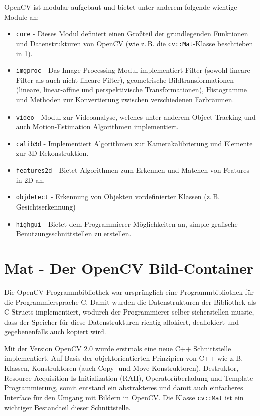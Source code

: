 \documentclass{whswinvcbook}
\begin{document}
OpenCV ist modular aufgebaut und bietet unter anderem folgende wichtige Module an:
\begin{itemize}
    \item \texttt{core} - Dieses Modul definiert einen Großteil der grundlegenden Funktionen und Datenstrukturen von OpenCV (wie z.\,B. die \texttt{cv::Mat}-Klasse beschrieben in \ref{section-mat}).
    \item \texttt{imgproc} - Das Image-Processing Modul implementiert Filter (sowohl lineare Filter als auch nicht lineare Filter), geometrische Bildtransformationen (lineare, linear-affine und perspektivische Transformationen), Histogramme und Methoden zur Konvertierung zwischen verschiedenen Farbräumen.
    \item \texttt{video} - Modul zur Videoanalyse, welches unter anderem Object-Tracking und auch Motion-Estimation Algorithmen implementiert.
    \item \texttt{calib3d} - Implementiert Algorithmen zur Kamerakalibrierung und Elemente zur 3D-Rekonstruktion.
    \item \texttt{features2d} - Bietet Algorithmen zum Erkennen und Matchen von Features in 2D an.
    \item \texttt{objdetect} - Erkennung von Objekten vordefinierter Klassen (z.\,B. Gesichtserkennung)
    \item \texttt{highgui} - Bietet dem Programmierer Möglichkeiten an, simple grafische Benutzungsschnittstellen zu erstellen.
\end{itemize}
\section{Mat - Der OpenCV Bild-Container}\label{section-mat}
Die OpenCV Programmbibliothek war ursprünglich eine Programmbibliothek für die Programmiersprache C. Damit wurden die Datenstrukturen der Bibliothek als C-Structs implementiert, wodurch der Programmierer selber sicherstellen musste, dass der Speicher für diese Datenstrukturen richtig allokiert, deallokiert und gegebenenfalls auch kopiert wird.

Mit der Version OpenCV 2.0 wurde erstmals eine neue C++ Schnittstelle implementiert. Auf Basis der objektorientierten Prinzipien von C++ wie z.\,B. Klassen, Konstruktoren (auch Copy- und Move-Konstruktoren), Destruktor, Resource Acquisition Is Initialization (RAII), Operatorüberladung und Template-Programmierung, somit entstand ein abstrakteres und damit auch einfacheres Interface für den Umgang mit Bildern in OpenCV. Die Klasse \texttt{cv::Mat} ist ein wichtiger Bestandteil dieser Schnittstelle.
\end{document}
